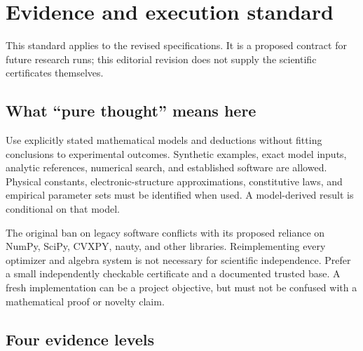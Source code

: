 \documentclass[
  11pt,
]{article}
\begin{document}
\section{Evidence and execution standard}

This standard applies to the revised specifications. It is a proposed
contract for future research runs; this editorial revision does not
supply the scientific certificates themselves.

\subsection{What ``pure thought'' means here}

Use explicitly stated mathematical models and deductions without fitting
conclusions to experimental outcomes. Synthetic examples, exact model
inputs, analytic references, numerical search, and established software
are allowed. Physical constants, electronic-structure approximations,
constitutive laws, and empirical parameter sets must be identified when
used. A model-derived result is conditional on that model.

The original ban on legacy software conflicts with its proposed reliance
on NumPy, SciPy, CVXPY, nauty, and other libraries. Reimplementing every
optimizer and algebra system is not necessary for scientific
independence. Prefer a small independently checkable certificate and a
documented trusted base. A fresh implementation can be a project
objective, but must not be confused with a mathematical proof or novelty
claim.

\subsection{Four evidence levels}
\end{document}
